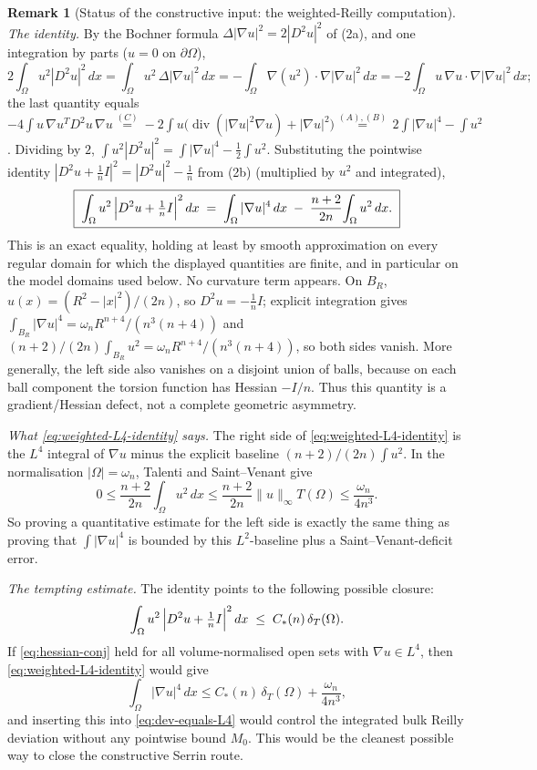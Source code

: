 \documentclass[11pt]{amsart}
\theoremstyle{definition}
\newtheorem{remark}[theorem]{Remark}
\newcommand{\Om}{\Omega}
\newcommand{\dT}{\delta_T}
\begin{document}
\begin{remark}[Status of the constructive input: the weighted-Reilly computation]
\emph{The identity.}
By the Bochner formula \(\Delta|\nabla u|^2=2|D^2u|^2\) of (2a), and one
integration by parts (\(u=0\) on \(\partial\Om\)),
\[
   2\!\int_{\Om}u^2|D^2u|^2\,dx
   =\int_{\Om}u^2\,\Delta|\nabla u|^2\,dx
   =-\int_{\Om}\nabla(u^2)\cdot\nabla|\nabla u|^2\,dx
   =-2\!\int_{\Om}u\,\nabla u\cdot\nabla|\nabla u|^2\,dx ;
\]
the last quantity equals
\(-4\!\int u\,\nabla u^TD^2u\,\nabla u\stackrel{(C)}{=}
-2\!\int u\bigl(\operatorname{div}(|\nabla u|^2\nabla u)+|\nabla u|^2\bigr)
\stackrel{(A),(B)}{=}\,2\!\int|\nabla u|^4-\int u^2\).  Dividing by \(2\),
\(\int u^2|D^2u|^2=\int|\nabla u|^4-\tfrac12\int u^2\).  Substituting the
pointwise identity \(|D^2u+\tfrac1n I|^2=|D^2u|^2-\tfrac1n\) from (2b)
(multiplied by \(u^2\) and integrated),
\begin{equation}\label{eq:weighted-L4-identity}
   \boxed{\;
   \int_{\Om}u^2\,\Bigl|D^2u+\tfrac1n I\Bigr|^2\,dx
   \;=\;
   \int_{\Om}|\nabla u|^4\,dx\;-\;\frac{n+2}{2n}\!\int_{\Om}u^2\,dx .
   \;}
\end{equation}
This is an exact equality, holding at least by smooth approximation on every
regular domain for which the displayed quantities are finite, and in particular
on the model domains used below.  No curvature term appears.  On \(B_R\),
\(u(x)=(R^2-|x|^2)/(2n)\), so \(D^2u=-\tfrac1n I\); explicit integration gives
\(\int_{B_R}|\nabla u|^4=\omega_n R^{n+4}/(n^3(n+4))\) and
\((n+2)/(2n)\int_{B_R}u^2=\omega_n R^{n+4}/(n^3(n+4))\), so both sides vanish.
More generally, the left side also vanishes on a disjoint union of balls, because
on each ball component the torsion function has Hessian \(-I/n\).  Thus this
quantity is a gradient/Hessian defect, not a complete geometric asymmetry.

\emph{What \eqref{eq:weighted-L4-identity} says.}
The right side of \eqref{eq:weighted-L4-identity} is the \(L^4\) integral of
\(\nabla u\) minus the explicit baseline \((n+2)/(2n)\int u^2\).  In the
normalisation \(|\Om|=\omega_n\), Talenti and Saint--Venant give
\[
   0\le\frac{n+2}{2n}\int_{\Om}u^2\,dx
   \le \frac{n+2}{2n}\|u\|_\infty T(\Om)
   \le \frac{\omega_n}{4n^3} .
\]
So proving a quantitative estimate for the left side is exactly the same thing
as proving that \(\int|\nabla u|^4\) is bounded by this \(L^2\)-baseline plus a
Saint--Venant-deficit error.

\emph{The tempting estimate.}
The identity points to the following possible closure:
\begin{equation}\label{eq:hessian-conj}
   \int_{\Om}u^2\,\Bigl|D^2u+\tfrac1n I\Bigr|^2\,dx
   \;\le\;C_*(n)\,\dT(\Om).
\end{equation}
If \eqref{eq:hessian-conj} held for all volume-normalised open sets with
\(\nabla u\in L^4\), then \eqref{eq:weighted-L4-identity} would give
\[
   \int_{\Om}|\nabla u|^4\,dx
   \le C_*(n)\,\dT(\Om)+\frac{\omega_n}{4n^3},
\]
and inserting this into \eqref{eq:dev-equals-L4} would control the integrated
bulk Reilly deviation without any pointwise bound \(M_0\).  This would be the
cleanest possible way to close the constructive Serrin route.


\end{remark}
\end{document}
